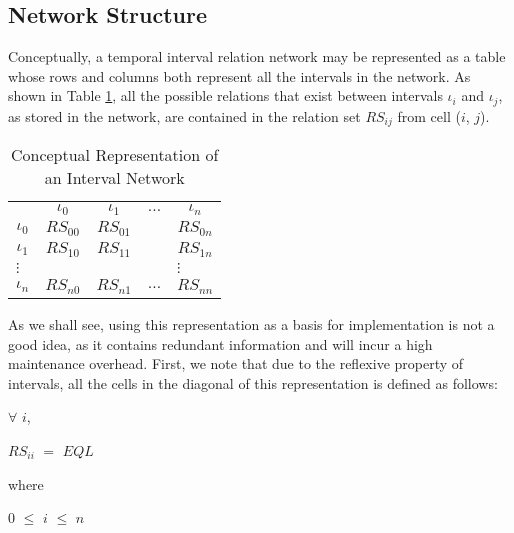 \documentclass[11pt]{report}
\newenvironment{vquote}
{
  \begin{list}{}{\leftmargin 1em}\item[]
}
{
  \end{list}
}
\begin{document}
      \subsection{Network Structure}
        \label{subs-impln-struc}

        Conceptually, a temporal interval relation network may be represented
        as a table whose rows and columns both represent all the intervals
        in the network. As shown in Table \ref{tabl-impln-concp}, all the
        possible relations that exist between intervals $\iota_i$ and
        $\iota_j$, as stored in the network, are contained in the relation set
        $RS_{ij}$ from cell ($i$, $j$).

        \begin{table}[tbhp]
          \begin{center}
            \begin{tabular}[t]{|c|c|c|c|c|}
              \cline{1-3}
              \cline{5-5}
              & $\iota_0$ & $\iota_1$ & $\ldots$ & $\iota_n$ \\
              \cline{1-3}
              \cline{5-5}
              $\iota_0$ & $RS_{00}$ & $RS_{01}$ & & $RS_{0n}$ \\
              \cline{1-3}
              \cline{5-5}
              $\iota_1$ & $RS_{10}$ & $RS_{11}$ & & $RS_{1n}$ \\
              \cline{1-3}
              \cline{5-5}
              \multicolumn{4}{l}{$\vdots$} & \multicolumn{1}{l}{$\vdots$} \\
              \cline{1-3}
              \cline{5-5}
              $\iota_n$ & $RS_{n0}$ & $RS_{n1}$ & $\ldots$ & $RS_{nn}$ \\
              \cline{1-3}
              \cline{5-5}
            \end{tabular}
          \end{center}
          \caption{Conceptual Representation of an Interval Network}
          \label{tabl-impln-concp}
        \end{table}

        As we shall see, using this representation as a basis for
        implementation is not a good idea, as it contains redundant information
        and will incur a high maintenance overhead. First, we note that due
        to the reflexive property of intervals, all the cells in the diagonal
        of this representation is defined as follows:

        \begin{vquote}
          $\forall$ $i$,

          $RS_{ii}$ $=$ {$EQL$}

          where

          \hspace{1em}
          $0$ $\leq$ $i$ $\leq$ $n$
        \end{vquote}
\end{document}
